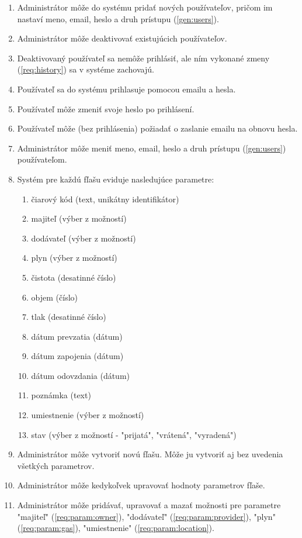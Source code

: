 \documentclass[hreffootnote]{zah}
\begin{document}
\begin{enumerate}
\item Administrátor môže do systému pridať nových používateľov, pričom im nastaví meno, email, heslo a druh prístupu (\ref{gen:users}).
\item Administrátor môže deaktivovať existujúcich používateľov.
\item Deaktivovaný používateľ sa nemôže prihlásiť, ale ním vykonané zmeny (\ref{req:history}) sa v systéme zachovajú.
\item Používateľ sa do systému prihlasuje pomocou emailu a hesla.
\item Používateľ môže zmeniť svoje heslo po prihlásení.
\item Používateľ môže (bez prihlásenia) požiadať o zaslanie emailu na obnovu hesla.
\item Administrátor môže meniť meno, email, heslo a druh prístupu (\ref{gen:users}) používateľom.
\item Systém pre každú fľašu eviduje nasledujúce parametre: 
\begin{enumerate}
	\tightlist
	\item čiarový kód (text, unikátny identifikátor)
	\item \label{req:param:owner} majiteľ (výber z možností)
	\item \label{req:param:provider} dodávateľ (výber z možností)
	\item \label{req:param:gas} plyn (výber z možností)
	\item čistota (desatinné číslo)
	\item objem (číslo)
	\item \label{req:param:pressure} tlak (desatinné číslo)
	\item dátum prevzatia (dátum)
	\item dátum zapojenia (dátum)
	\item dátum odovzdania (dátum)
	\item poznámka (text)
	\item \label{req:param:location} umiestnenie (výber z možností)
	\item stav (výber z možností - "prijatá", "vrátená", "vyradená")
\end{enumerate}
\item Administrátor môže vytvoriť novú fľašu. Môže ju vytvoriť aj bez uvedenia všetkých parametrov.
\item Administrátor môže kedykoľvek upravovať hodnoty parametrov fľaše.
\item Administrátor môže pridávať, upravovať a mazať možnosti pre parametre "majiteľ" (\ref{req:param:owner}), "dodávateľ" (\ref{req:param:provider}), "plyn" (\ref{req:param:gas}), "umiestnenie" (\ref{req:param:location}).

\end{enumerate}
\end{document}
